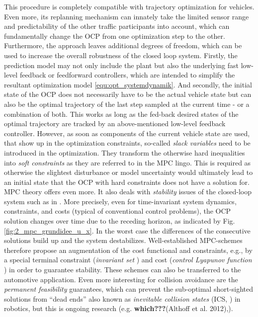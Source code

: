 This procedure is completely compatible with trajectory optimization for vehicles. Even more, its replanning mechanism can innately take the limited sensor range and predictability of the other traffic participants into account, which can fundamentally change the OCP from one optimization step to the other. Furthermore, the approach leaves additional degrees of freedom, which can be used to increase the overall robustness of the closed loop system. Firstly, the prediction model may not only include the plant but also the underlying fast low-level feedback or feedforward controllers, which are intended to simplify the resultant optimization model \eqref{equ:opt_systemdynamik}. And secondly, the initial state of the OCP does not necessarily have to be the actual vehicle state but can also be the optimal trajectory of the last step sampled at the current time - or a combination of both. This works as long as the fed-back desired states of the optimal trajectory are tracked by an above-mentioned low-level feedback controller. However, as soon as components of the current vehicle state are used, that show up in the optimization constraints, so-called \emph{slack variables} need to be introduced in the optimization. They transform the otherwise hard inequalities into \emph{soft constraints} as they are referred to in the MPC lingo. This is required as otherwise the slightest disturbance or model uncertainty would ultimately lead to an initial state that the OCP with hard constraints does not have a solution for.
MPC theory offers even more. It also deals with \emph{stability} issues of the closed-loop system such as in \cite{gruene2011nonlinear}. More precisely, even for time-invariant system dynamics, constraints, and costs (typical of conventional control problems), the OCP solution changes over time due to the receding horizon, as indicated by Fig.\,\ref{fig:2_mpc_grundidee_u_x}. In the worst case the differences of the consecutive solutions build up and the system destabilizes. Well-established MPC-schemes therefore propose an augmentation of the cost functional and constraints, e.g., by a special terminal constraint (\emph{invariant set} \cite{blanchini1999survey})  and cost (\emph{control Lyapunov function} \cite{gruene2011nonlinear}) 
   in order to guarantee stability. These schemes can also be transferred to the automotive application. Even more interesting for collision avoidance are the \emph{permanent feasibility} guarantees, which can prevent the sub-optimal short-sighted solutions from “dead ends” also known as \emph{inevitable collision states} (ICS, \cite{fraichard2007short}) in robotics, but this is ongoing research (e.g. \textbf{which???}(Althoff et al. 2012),\cite{Lawitzky2014ICRA}).




